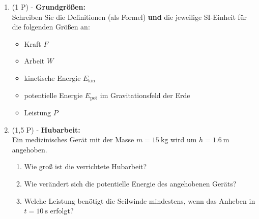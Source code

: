 \documentclass[11pt, a4paper]{article}
\begin{document}
\begin{enumerate}[label=\textbf{\arabic*.},itemsep=0.55cm]

    \item (1 P) - \textbf{Grundgrößen:} \\
    Schreiben Sie die Definitionen (als Formel) \textbf{und} die jeweilige SI-Einheit für die folgenden Größen an:
    \begin{itemize}
        \item Kraft $F$
        \item Arbeit $W$
        \item kinetische Energie $E_{\text{kin}}$
        \item potentielle Energie $E_{\text{pot}}$ im Gravitationsfeld der Erde
        \item Leistung $P$
    \end{itemize}
    \vspace{1cm}
    \item (1,5 P) - \textbf{Hubarbeit:} \\
    Ein medizinisches Gerät mit der Masse $m = \SI{15}{\kilogram}$ wird um $h = \SI{1.6}{\meter}$ angehoben.
    \begin{enumerate}[label=(\alph*)]
        \item Wie groß ist die verrichtete Hubarbeit?
        \item Wie verändert sich die potentielle Energie des angehobenen Geräts?
        \item Welche Leistung benötigt die Seilwinde mindestens, wenn das Anheben in $t = \SI{10}{\second}$ erfolgt?
    \end{enumerate}
    \vspace{2cm}


\end{enumerate}
\end{document}
